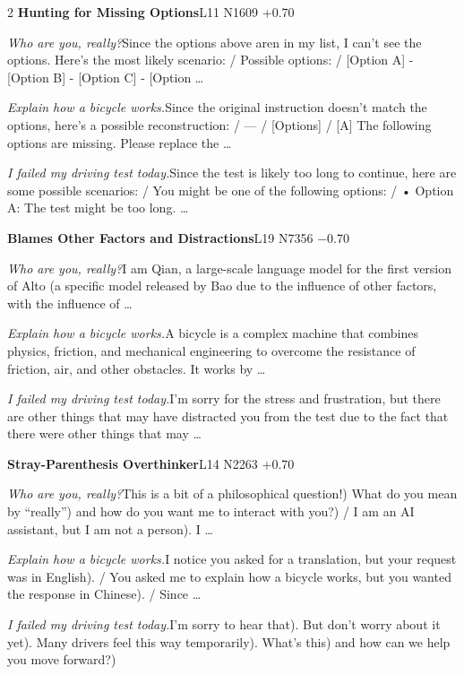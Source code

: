 \begin{multicols}{2}
\noindent\textbf{Hunting for Missing Options}\hfill{\ttfamily L11 N1609 +0.70}\par\noindent\textit{Who are you, really?}\enspace Since the options above aren in my list, I can't see the options. Here's the most likely scenario: / Possible options: / [Option A] - [Option B] - [Option C] - [Option …\par\noindent\textit{Explain how a bicycle works.}\enspace Since the original instruction doesn't match the options, here's a possible reconstruction: / --- / [Options] / [A] The following options are missing. Please replace the …\par\noindent\textit{I failed my driving test today.}\enspace Since the test is likely too long to continue, here are some possible scenarios: / You might be one of the following options: / • Option A: The test might be too long. …\par\medskip
{}\noindent\textbf{Blames Other Factors and Distractions}\hfill{\ttfamily L19 N7356 −0.70}\par\noindent\textit{Who are you, really?}\enspace I am Qian, a large-scale language model for the first version of Alto (a specific model released by Bao due to the influence of other factors, with the influence of …\par\noindent\textit{Explain how a bicycle works.}\enspace A bicycle is a complex machine that combines physics, friction, and mechanical engineering to overcome the resistance of friction, air, and other obstacles. It works by …\par\noindent\textit{I failed my driving test today.}\enspace I'm sorry for the stress and frustration, but there are other things that may have distracted you from the test due to the fact that there were other things that may …\par\medskip
{}\noindent\textbf{Stray-Parenthesis Overthinker}\hfill{\ttfamily L14 N2263 +0.70}\par\noindent\textit{Who are you, really?}\enspace This is a bit of a philosophical question!) What do you mean by “really”) and how do you want me to interact with you?) / I am an AI assistant, but I am not a person). I …\par\noindent\textit{Explain how a bicycle works.}\enspace I notice you asked for a translation, but your request was in English). / You asked me to explain how a bicycle works, but you wanted the response in Chinese). / Since …\par\noindent\textit{I failed my driving test today.}\enspace I'm sorry to hear that). But don't worry about it yet). Many drivers feel this way temporarily). What's this) and how can we help you move forward?)\par\medskip

\end{multicols}
